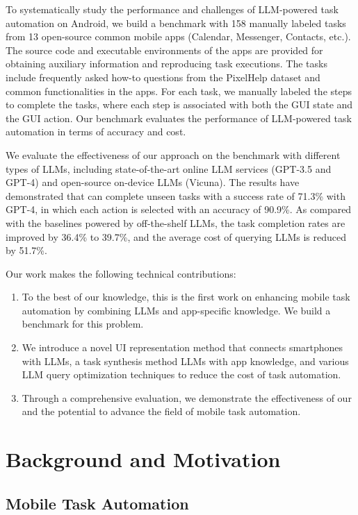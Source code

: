 To systematically study the performance and challenges of LLM-powered task automation on Android, we build a benchmark with 158 manually labeled tasks from 13 open-source common mobile apps (Calendar, Messenger, Contacts, etc.).
The source code and executable environments of the apps are provided for obtaining auxiliary information and reproducing task executions.
The tasks include frequently asked how-to questions from the PixelHelp \cite{seq2act} dataset and common functionalities in the apps.
For each task, we manually labeled the steps to complete the tasks, where each step is associated with both the GUI state and the GUI action.
Our benchmark evaluates the performance of LLM-powered task automation in terms of accuracy and cost.

We evaluate the effectiveness of our \name approach on the benchmark with different types of LLMs, including state-of-the-art online LLM services (GPT-3.5 and GPT-4) and open-source on-device LLMs (Vicuna). 
The results have demonstrated that \name can complete unseen tasks with a success rate of 71.3\% with GPT-4, in which each action is selected with an accuracy of 90.9\%.
As compared with the baselines powered by off-the-shelf LLMs, the task completion rates are improved by 36.4\% to 39.7\%, and the average cost of querying LLMs is reduced by 51.7\%. %

Our work makes the following technical contributions:
\begin{enumerate}
    \item To the best of our knowledge, this is the first work on enhancing mobile task automation by combining LLMs and app-specific knowledge. We build a benchmark for this problem.
    \item We introduce a novel UI representation method that connects smartphones with LLMs, a task synthesis method  LLMs with app knowledge, and various LLM query optimization techniques to reduce the cost of task automation.
    \item Through a comprehensive evaluation, we demonstrate the effectiveness of our  and the potential to advance the field of mobile task automation.
\end{enumerate}

\section{Background and Motivation}
\label{section:background}

\subsection{Mobile Task Automation}

